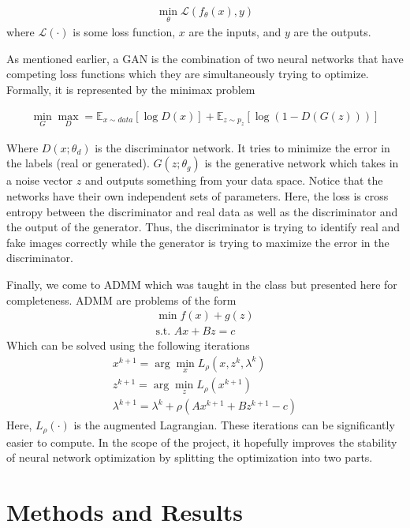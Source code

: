 \documentclass{article}
\begin{document}
  \begin{gather*}
    \min_{\theta} \mathcal{L}(f_\theta(x), y)
  \end{gather*}
  where $\mathcal{L}(\cdot)$ is some loss function, $x$ are the inputs, and $y$ are the outputs.

  As mentioned earlier, a GAN is the combination of two neural networks that have competing loss functions which they are simultaneously trying to optimize. Formally, it is represented by the minimax problem

  \begin{gather*}
    \min_G \max_D = \mathbb{E}_{x \sim data} [\log D(x)] + \mathbb{E}_{z \sim p_z} [\log (1- D(G(z)))]
  \end{gather*}

  Where $D(x; \theta_d)$ is the discriminator network. It tries to minimize the error in the labels (real or generated). $G(z; \theta_g)$ is the generative network which takes in a noise vector $z$ and outputs something from your data space. Notice that the networks have their own independent sets of parameters. Here, the loss is cross entropy between the discriminator and real data as well as the discriminator and the output of the generator. Thus, the discriminator is trying to identify real and fake images correctly while the generator is trying to maximize the error in the discriminator.

  Finally, we come to ADMM which was taught in the class but presented here for completeness. ADMM are problems of the form
  \begin{gather*}
    \min f(x) + g(z) \\
    \text{s.t. } Ax + Bz = c
  \end{gather*}
  Which can be solved using the following iterations
  \begin{gather*}
    x^{k+1} = \arg\min_x L_\rho (x, z^k, \lambda^k) \\
    z^{k+1} = \arg\min_z L_\rho (x^{k+1}) \\
    \lambda^{k+1} = \lambda^k + \rho (A x^{k+1} + B z^{k+1} - c)
  \end{gather*}
  Here, $L_\rho(\cdot)$ is the augmented Lagrangian. These iterations can be significantly easier to compute. In the scope of the project, it hopefully improves the stability of neural network optimization by splitting the optimization into two parts.

  \section{Methods and Results}
\end{document}
